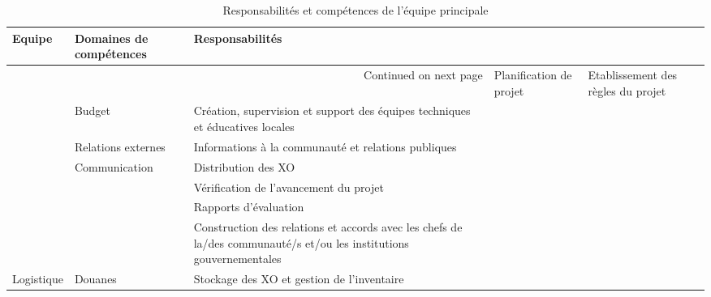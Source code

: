 \documentclass[12pt]{article}
\begin{document}
\begin{longtable}{|p{2cm}|p{5cm}|p{8cm}|}
\caption{Responsabilités et compétences de l'équipe principale} \\
\hline
 Equipe                     &  Domaines de compétences                                      &  Responsabilités                                                                                                                \\
\hline
\endhead
\hline\multicolumn{3}{r}{Continued on next page}\
\endfoot
\endlastfoot
\hline
 Direction du projet        &  Planification de projet                                      &  Etablissement des règles du projet                                                                                              \\
                            &  Budget                                                       &  Création, supervision et support des équipes techniques et éducatives locales                                                   \\
                            &  Relations externes                                           &  Informations à la communauté et relations publiques                                                                             \\
                            &  Communication                                                &  Distribution des XO                                                                                                             \\
                            &                                                               &  Vérification de l’avancement du projet                                                                                          \\
                            &                                                               &  Rapports d’évaluation                                                                                                           \\
                            &                                                               &  Construction des relations et accords avec les chefs de la/des communauté/s et/ou les institutions gouvernementales             \\
\hline
 Logistique                 &  Douanes                                                      &  Stockage des XO et gestion de l’inventaire                                                                                      \\

\end{longtable}
\end{document}
